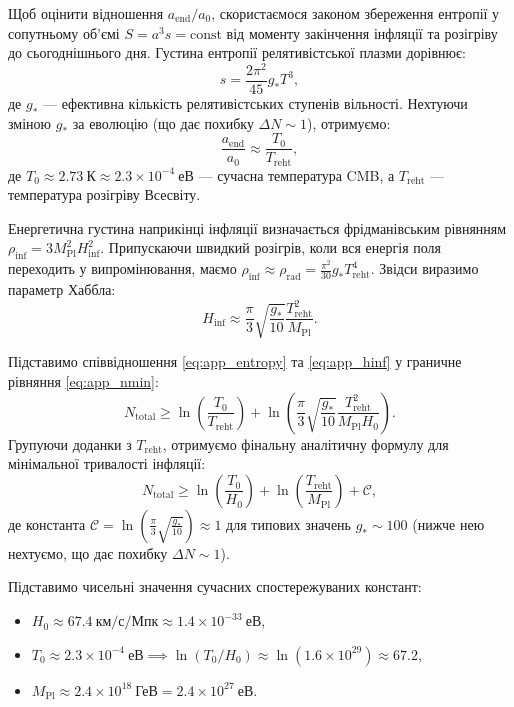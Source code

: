 Щоб оцінити відношення $a_{\mathrm{end}}/a_0$, скористаємося законом збереження ентропії у сопутньому об'ємі $S = a^3 s = \text{const}$ від моменту закінчення інфляції та розігріву до сьогоднішнього дня. Густина ентропії релятивістської плазми дорівнює:
\begin{equation}
s = \frac{2\pi^2}{45} g_* T^3,
\end{equation}
де $g_*$ --- ефективна кількість релятивістських ступенів вільності. Нехтуючи зміною $g_*$ за еволюцію (що дає похибку $\Delta N \sim 1$), отримуємо:
\begin{equation}
\label{eq:app_entropy}
\frac{a_{\mathrm{end}}}{a_0} \approx \frac{T_0}{T_{\mathrm{reht}}},
\end{equation}
де $T_0 \approx 2.73~\text{К} \approx 2.3 \times 10^{-4}~\text{еВ}$ --- сучасна температура CMB, а $T_{\mathrm{reht}}$ --- температура розігріву Всесвіту.

Енергетична густина наприкінці інфляції визначається фрідманівським рівнянням $\rho_{\mathrm{inf}} = 3 M_{\mathrm{Pl}}^2 H_{\mathrm{inf}}^2$. Припускаючи швидкий розігрів, коли вся енергія поля переходить у випромінювання, маємо $\rho_{\mathrm{inf}} \approx \rho_{\mathrm{rad}} = \frac{\pi^2}{30} g_* T_{\mathrm{reht}}^4$. Звідси виразимо параметр Хаббла:
\begin{equation}
\label{eq:app_hinf}
H_{\mathrm{inf}} \approx \frac{\pi}{3} \sqrt{\frac{g_*}{10}} \frac{T_{\mathrm{reht}}^2}{M_{\mathrm{Pl}}}.
\end{equation}

Підставимо співвідношення \eqref{eq:app_entropy} та \eqref{eq:app_hinf} у граничне рівняння \eqref{eq:app_nmin}:
\begin{equation}
N_{\mathrm{total}} \ge \ln \left( \frac{T_0}{T_{\mathrm{reht}}} \right) + \ln \left( \frac{\pi}{3} \sqrt{\frac{g_*}{10}} \frac{T_{\mathrm{reht}}^2}{M_{\mathrm{Pl}} H_0} \right).
\end{equation}
Групуючи доданки з $T_{\mathrm{reht}}$, отримуємо фінальну аналітичну формулу для мінімальної тривалості інфляції:
\begin{equation}
\label{eq:app_final_n}
N_{\mathrm{total}} \ge \ln \left( \frac{T_0}{H_0} \right) + \ln \left( \frac{T_{\mathrm{reht}}}{M_{\mathrm{Pl}}} \right) + \mathcal{C},
\end{equation}
де константа $\mathcal{C} = \ln \left( \frac{\pi}{3} \sqrt{\frac{g_*}{10}} \right) \approx 1$ для типових значень $g_* \sim 100$ (нижче нею нехтуємо, що дає похибку $\Delta N\sim1$).

Підставимо чисельні значення сучасних спостережуваних констант:
\begin{itemize}
    \item $H_0 \approx 67.4~\text{км/с/Мпк} \approx 1.4 \times 10^{-33}~\text{еВ}$,
    \item $T_0 \approx 2.3 \times 10^{-4}~\text{еВ} \implies \ln(T_0 / H_0) \approx \ln(1.6 \times 10^{29}) \approx 67.2$,
    \item $M_{\mathrm{Pl}} \approx 2.4 \times 10^{18}~\text{ГеВ} = 2.4 \times 10^{27}~\text{еВ}$.
\end{itemize}

